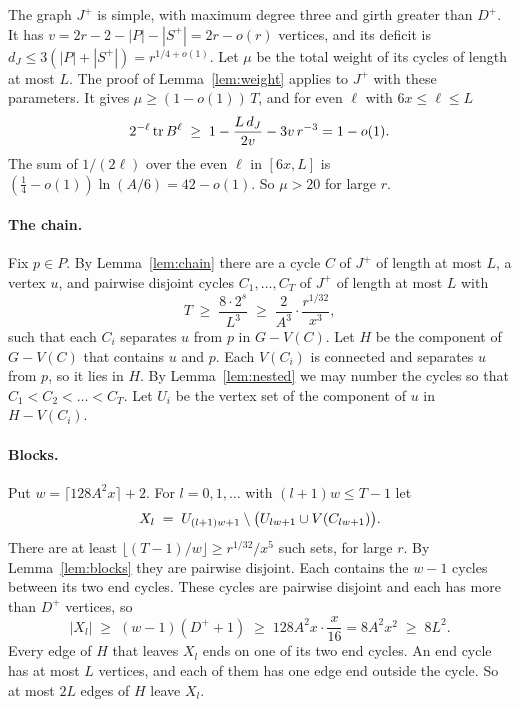 The graph $J^{+}$ is simple, with maximum degree three and girth greater than $D^{+}$. It has
$v=2r-2-|P|-|S^{+}|=2r-o(r)$ vertices, and its deficit is $d_J\le3(|P|+|S^{+}|)=r^{1/4+o(1)}$. Let
$\mu$ be the total weight of its cycles of length at most $L$. The proof of
Lemma~\ref{lem:weight} applies to $J^{+}$ with these parameters. It gives
$\mu\ge(1-o(1))\,T$, and for even $\ell$ with $6x\le\ell\le L$
\[
  2^{-\ell}\operatorname{tr} B^{\ell}\;\ge\;1-\frac{L\,d_J}{2v}-3v\,r^{-3}=1-o(1).
\]
The sum of $1/(2\ell)$ over the even $\ell$ in $[6x,L]$ is $(\frac14-o(1))\ln(A/6)=42-o(1)$. So
$\mu>20$ for large $r$.

\paragraph{The chain.}
Fix $p\in P$. By Lemma~\ref{lem:chain} there are a cycle $C$ of $J^{+}$ of length at most $L$, a
vertex $u$, and pairwise disjoint cycles $C_1,\dots,C_T$ of $J^{+}$ of length at most $L$ with
\[
  T\;\ge\;\frac{8\cdot2^{s}}{L^{3}}\;\ge\;\frac{2}{A^{3}}\cdot\frac{r^{1/32}}{x^{3}},
\]
such that each $C_i$ separates $u$ from $p$ in $G-V(C)$. Let $H$ be the component of $G-V(C)$
that contains $u$ and $p$. Each $V(C_i)$ is connected and separates $u$ from $p$, so it lies in $H$.
By Lemma~\ref{lem:nested} we may number the cycles so that $C_1<C_2<\dots<C_T$. Let $U_i$ be the
vertex set of the component of $u$ in $H-V(C_i)$.

\paragraph{Blocks.}
Put $w=\lceil128A^{2}x\rceil+2$. For $l=0,1,\dots$ with $(l+1)w\le T-1$ let
\[
  X_l\;=\;U_{(l+1)w+1}\setminus\bigl(U_{lw+1}\cup V(C_{lw+1})\bigr).
\]
There are at least $\lfloor(T-1)/w\rfloor\ge r^{1/32}/x^{5}$ such sets, for large $r$. By
Lemma~\ref{lem:blocks} they are pairwise disjoint. Each contains the $w-1$ cycles between its two
end cycles. These cycles are pairwise disjoint and each has more than $D^{+}$ vertices, so
\[
  |X_l|\;\ge\;(w-1)(D^{+}+1)\;\ge\;128A^{2}x\cdot\frac x{16}=8A^{2}x^{2}\;\ge\;8L^{2}.
\]
Every edge of $H$ that leaves $X_l$ ends on one of its two end cycles. An end cycle has at most $L$
vertices, and each of them has one edge end outside the cycle. So at most $2L$ edges of $H$ leave
$X_l$.

